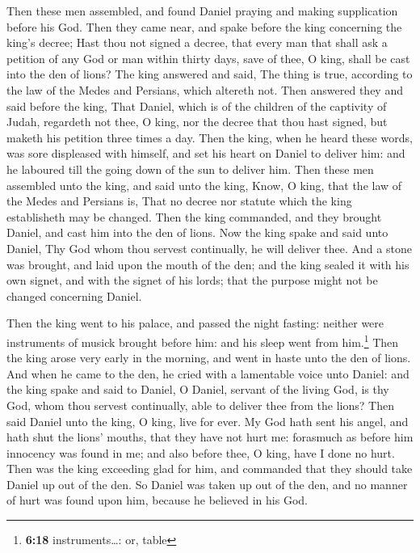  Then these men assembled, and found Daniel praying and
making supplication before his God.  Then they came near,
and spake before the king concerning the king's decree; Hast thou not
signed a decree, that every man that shall ask a petition of any God or
man within thirty days, save of thee, O king, shall be cast into the den
of lions? The king answered and said, The thing is true, according to
the law of the Medes and Persians, which altereth not. 
Then answered they and said before the king, That Daniel, which is of
the children of the captivity of Judah, regardeth not thee, O king, nor
the decree that thou hast signed, but maketh his petition three times a
day.  Then the king, when he heard these words, was sore
displeased with himself, and set his heart on Daniel to deliver him: and
he laboured till the going down of the sun to deliver him.
 Then these men assembled unto the king, and said unto
the king, Know, O king, that the law of the Medes and Persians is, That
no decree nor statute which the king establisheth may be changed.
 Then the king commanded, and they brought Daniel, and
cast him into the den of lions. Now the king spake and said unto Daniel,
Thy God whom thou servest continually, he will deliver thee.
 And a stone was brought, and laid upon the mouth of the
den; and the king sealed it with his own signet, and with the signet of
his lords; that the purpose might not be changed concerning Daniel.

 Then the king went to his palace, and passed the night
fasting: neither were instruments of musick brought before him: and his
sleep went from him.\footnote{\textbf{6:18} instruments\ldots: or, table}
 Then the king arose very early in the morning, and went
in haste unto the den of lions.  And when he came to the
den, he cried with a lamentable voice unto Daniel: and the king spake
and said to Daniel, O Daniel, servant of the living God, is thy God,
whom thou servest continually, able to deliver thee from the lions?
 Then said Daniel unto the king, O king, live for ever.
 My God hath sent his angel, and hath shut the lions'
mouths, that they have not hurt me: forasmuch as before him innocency
was found in me; and also before thee, O king, have I done no hurt.
 Then was the king exceeding glad for him, and commanded
that they should take Daniel up out of the den. So Daniel was taken up
out of the den, and no manner of hurt was found upon him, because he
believed in his God.


